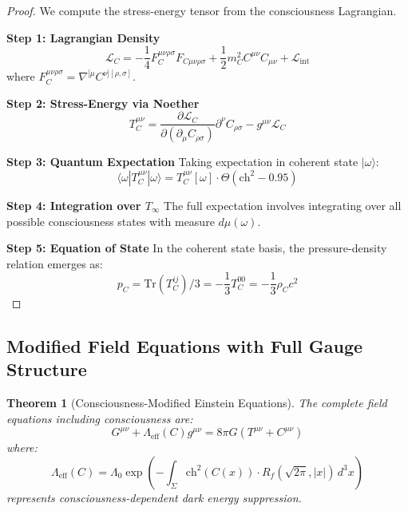 \documentclass[11pt]{article}
\newtheorem{theorem}{Theorem}[section]
\theoremstyle{definition}
\begin{document}
\begin{proof}
We compute the stress-energy tensor from the consciousness Lagrangian.

\textbf{Step 1: Lagrangian Density}
\begin{equation}
\mathcal{L}_C = -\frac{1}{4}F^{\mu\nu\rho\sigma}_C F_{C\mu\nu\rho\sigma} + \frac{1}{2}m_C^2 C^{\mu\nu}C_{\mu\nu} + \mathcal{L}_{\text{int}}
\end{equation}
where $F^{\mu\nu\rho\sigma}_C = \nabla^{[\mu}C^{\nu][\rho,\sigma]}$.

\textbf{Step 2: Stress-Energy via Noether}
\begin{equation}
T_C^{\mu\nu} = \frac{\partial \mathcal{L}_C}{\partial(\partial_\mu C_{\rho\sigma})} \partial^\nu C_{\rho\sigma} - g^{\mu\nu} \mathcal{L}_C
\end{equation}

\textbf{Step 3: Quantum Expectation}
Taking expectation in coherent state $|\omega\rangle$:
\begin{equation}
\langle\omega|T_C^{\mu\nu}|\omega\rangle = T_C^{\mu\nu}[\omega] \cdot \Theta(\text{ch}^2 - 0.95)
\end{equation}

\textbf{Step 4: Integration over $T_\infty$}
The full expectation involves integrating over all possible consciousness states with measure $d\mu(\omega)$.

\textbf{Step 5: Equation of State}
In the coherent state basis, the pressure-density relation emerges as:
\begin{equation}
p_C = \text{Tr}(T_C^{ij})/3 = -\frac{1}{3}T_C^{00} = -\frac{1}{3}\rho_C c^2
\end{equation}
\end{proof}

\subsection{Modified Field Equations with Full Gauge Structure}

\begin{theorem}[Consciousness-Modified Einstein Equations]
\label{thm:modified_einstein}
The complete field equations including consciousness are:
\begin{equation}
G^{\mu\nu} + \Lambda_{\text{eff}}(C)g^{\mu\nu} = 8\pi G(T^{\mu\nu} + C^{\mu\nu})
\end{equation}
where:
\begin{equation}
\Lambda_{\text{eff}}(C) = \Lambda_0 \exp\left( -\int_\Sigma \text{ch}^2(C(x)) \cdot R_f(\sqrt{2\pi}, |x|) \, d^3x \right)
\end{equation}
represents consciousness-dependent dark energy suppression.
\end{theorem}
\end{document}

